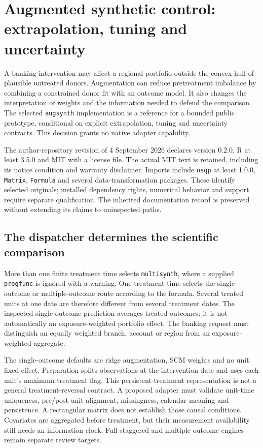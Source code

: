 \section{Augmented synthetic control: extrapolation, tuning and uncertainty}
\label{sec:exec24-augsynth-reuse}

A banking intervention may affect a regional portfolio outside the convex
hull of plausible untreated donors. Augmentation can reduce pretreatment
imbalance by combining a constrained donor fit with an outcome model. It
also changes the interpretation of weights and the information needed to
defend the comparison. The selected \texttt{augsynth} implementation is a
reference for a bounded public prototype, conditional on explicit
extrapolation, tuning and uncertainty contracts. This decision grants no
native adapter capability.\citep{exec24_augsynth_choice}

The author-repository revision of 4 September 2026 declares version 0.2.0,
R at least 3.5.0 and MIT with a license file. The actual MIT text is retained,
including its notice condition and warranty disclaimer. Imports include
\texttt{osqp} at least 1.0.0, \texttt{Matrix}, \texttt{Formula} and several
data-transformation packages. These identify selected originals; installed
dependency rights, numerical behavior and support require separate
qualification. The inherited documentation record is preserved without
extending its claims to uninspected paths.
\citep{exec24_augsynth_source,v12_sw_augsynth}

\subsection{The dispatcher determines the scientific comparison}
More than one finite treatment time selects \texttt{multisynth}, where a
supplied \texttt{progfunc} is ignored with a warning. One treatment time
selects the single-outcome or multiple-outcome route according to the
formula. Several treated units at one date are therefore different from
several treatment dates. The inspected single-outcome prediction averages
treated outcomes; it is not automatically an exposure-weighted portfolio
effect. The banking request must distinguish an equally weighted branch,
account or region from an exposure-weighted aggregate.
\citep{exec24_augsynth_source}

The single-outcome defaults are ridge augmentation, SCM weights and no unit
fixed effect. Preparation splits observations at the intervention date and
uses each unit's maximum treatment flag. This persistent-treatment
representation is not a general treatment-reversal contract. A proposed
adapter must validate unit-time uniqueness, pre/post unit alignment,
missingness, calendar meaning and persistence. A rectangular matrix does
not establish those causal conditions. Covariates are aggregated before
treatment, but their measurement availability still needs an information
clock. Full staggered and multiple-outcome engines remain separate review
targets.\citep{exec24_augsynth_source,exec24_augsynth_choice}

